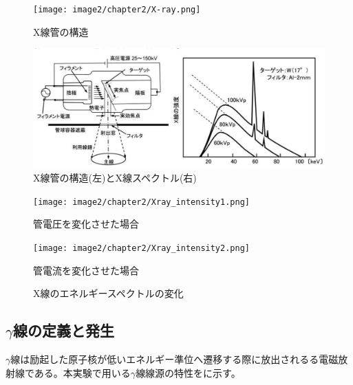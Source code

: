 \begin{figure}[H]
 \begin{center}
 \texttt{[image: image2/chapter2/X-ray.png]} 
 \end{center}
 \caption{X線管の構造\cite{iinuma}}
 \label{fig:Xray:}
\end{figure}

\begin{figure}[H]
 \begin{center}
 \includegraphics[width=14cm]{image/other/X-ray.eps}
 \end{center}
 \caption{X線管の構造(左)とX線スペクトル(右)\cite{iinuma}}
 \label{fig:Xray}
\end{figure}
\fi

\begin{figure}[H]
 \begin{minipage}{0.5\hsize}
  \begin{center}
   \texttt{[image: image2/chapter2/Xray\_intensity1.png]} 
  \end{center}
  \vspace{0.cm}
  \caption*{管電圧を変化させた場合}
 \end{minipage}
 \begin{minipage}{0.5\hsize}
  \begin{center}
 \texttt{[image: image2/chapter2/Xray\_intensity2.png]} 
  \end{center}
  \vspace{0cm}
  \caption*{管電流を変化させた場合}
 \end{minipage}
 \begin{center}
  \caption{X線のエネルギースペクトルの変化}
  \label{fig:Xray_intensity}
  \end{center}
\end{figure}



%

\subsection{$\gamma$線の定義と発生}
$\gamma$線は励起した原子核が低いエネルギー準位へ遷移する際に放出されるる電磁放射線である。本実験で用いる$\gamma$線線源の特性をに示す。


